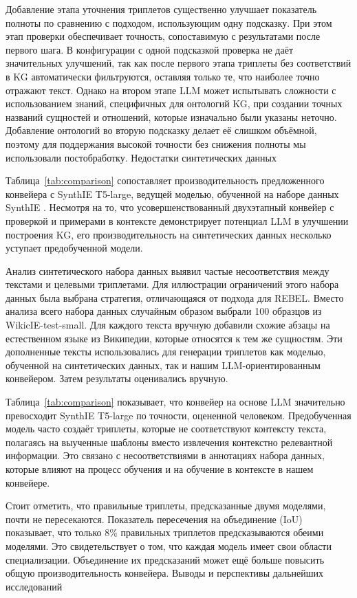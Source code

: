 Добавление этапа уточнения триплетов существенно улучшает показатель полноты по сравнению с подходом, использующим одну подсказку. При этом этап проверки обеспечивает точность, сопоставимую с результатами после первого шага. В конфигурации с одной подсказкой проверка не даёт значительных улучшений, так как после первого этапа триплеты без соответствий в KG автоматически фильтруются, оставляя только те, что наиболее точно отражают текст. Однако на втором этапе LLM может испытывать сложности с использованием знаний, специфичных для онтологий KG, при создании точных названий сущностей и отношений, которые изначально были указаны неточно. Добавление онтологий во вторую подсказку делает её слишком объёмной, поэтому для поддержания высокой точности без снижения полноты мы использовали постобработку.
Недостатки синтетических данных

Таблица~\ref{tab:comparison} сопоставляет производительность предложенного конвейера с SynthIE T5-large, ведущей моделью, обученной на наборе данных SynthIE \cite{josifoski2023exploiting}. Несмотря на то, что усовершенствованный двухэтапный конвейер с проверкой и примерами в контексте демонстрирует потенциал LLM в улучшении построения KG, его производительность на синтетических данных несколько уступает предобученной модели.

Анализ синтетического набора данных выявил частые несоответствия между текстами и целевыми триплетами. Для иллюстрации ограничений этого набора данных была выбрана стратегия, отличающаяся от подхода \cite{josifoski2023exploiting} для REBEL. Вместо анализа всего набора данных случайным образом выбрали 100 образцов из WikicIE-test-small. Для каждого текста вручную добавили схожие абзацы на естественном языке из Википедии, которые относятся к тем же сущностям. Эти дополненные тексты использовались для генерации триплетов как моделью, обученной на синтетических данных, так и нашим LLM-ориентированным конвейером. Затем результаты оценивались вручную.

Таблица~\ref{tab:comparison} показывает, что конвейер на основе LLM значительно превосходит SynthIE T5-large по точности, оцененной человеком. Предобученная модель часто создаёт триплеты, которые не соответствуют контексту текста, полагаясь на выученные шаблоны вместо извлечения контекстно релевантной информации. Это связано с несоответствиями в аннотациях набора данных, которые влияют на процесс обучения и на обучение в контексте в нашем конвейере.

Стоит отметить, что правильные триплеты, предсказанные двумя моделями, почти не пересекаются. Показатель пересечения на объединение (IoU) показывает, что только 8\% правильных триплетов предсказываются обеими моделями. Это свидетельствует о том, что каждая модель имеет свои области специализации. Объединение их предсказаний может ещё больше повысить общую производительность конвейера.
Выводы и перспективы дальнейших исследований

